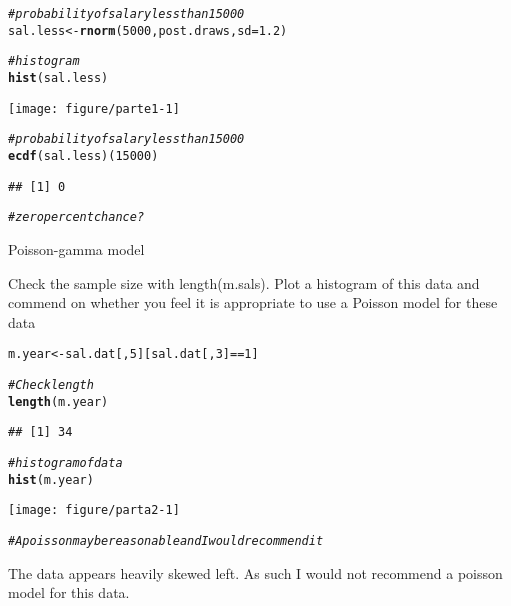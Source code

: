 \documentclass[12pt]{article}\usepackage[]{graphicx}\usepackage[]{color}
\makeatletter
\def\maxwidth{ %
  \ifdim\Gin@nat@width>\linewidth
    \linewidth
  \else
    \Gin@nat@width
  \fi
}
\newcommand{\hlnum}[1]{\textcolor[rgb]{0.686,0.059,0.569}{#1}}%
\newcommand{\hlcom}[1]{\textcolor[rgb]{0.678,0.584,0.686}{\textit{#1}}}%
\newcommand{\hlopt}[1]{\textcolor[rgb]{0,0,0}{#1}}%
\newcommand{\hlstd}[1]{\textcolor[rgb]{0.345,0.345,0.345}{#1}}%
\newcommand{\hlkwb}[1]{\textcolor[rgb]{0.69,0.353,0.396}{#1}}%
\newcommand{\hlkwc}[1]{\textcolor[rgb]{0.333,0.667,0.333}{#1}}%
\newcommand{\hlkwd}[1]{\textcolor[rgb]{0.737,0.353,0.396}{\textbf{#1}}}%
\newenvironment{kframe}{%
 \def\at@end@of@kframe{}%
 \ifinner\ifhmode%
  \def\at@end@of@kframe{\end{minipage}}%
  \begin{minipage}{\columnwidth}%
 \fi\fi%
 \def\FrameCommand##1{\hskip\@totalleftmargin \hskip-\fboxsep
 \colorbox{shadecolor}{##1}\hskip-\fboxsep
     \hskip-\linewidth \hskip-\@totalleftmargin \hskip\columnwidth}%
 \MakeFramed {\advance\hsize-\width
   \@totalleftmargin\z@ \linewidth\hsize
   \@setminipage}}%
 {\par\unskip\endMakeFramed%
 \at@end@of@kframe}
\newenvironment{knitrout}{}{} %
\newenvironment{exercise}[2][Exercise]{\begin{trivlist}
\item[\hskip \labelsep {\bfseries #1}\hskip \labelsep {\bfseries #2.}]}{\end{trivlist}}
\newenvironment{problem}[2][Problem]{\begin{trivlist}
\item[\hskip \labelsep {\bfseries #1}\hskip \labelsep {\bfseries #2.}]}{\end{trivlist}}
\makeatother
\begin{document}
\begin{knitrout}
\color{fgcolor}\begin{kframe}
\begin{alltt}
\hlcom{#probability of salary less than 15000}
\hlstd{sal.less} \hlkwb{<-} \hlkwd{rnorm}\hlstd{(}\hlnum{5000}\hlstd{,post.draws,}\hlkwc{sd}\hlstd{=}\hlnum{1.2}\hlstd{)}

\hlcom{#histogram}
\hlkwd{hist}\hlstd{(sal.less)}
\end{alltt}
\end{kframe}

{\centering \texttt{[image: figure/parte1-1]} 

}


\begin{kframe}\begin{alltt}
\hlcom{#probability of salary less than 15000}
\hlkwd{ecdf}\hlstd{(sal.less)(}\hlnum{15000}\hlstd{)}
\end{alltt}
\begin{verbatim}
## [1] 0
\end{verbatim}
\begin{alltt}
\hlcom{# zero percent chance?}
\end{alltt}
\end{kframe}
\end{knitrout}


\begin{exercise}{2}Poisson-gamma model
\end{exercise}

\begin{problem}{a}
Check the sample size with length(m.sals). Plot a histogram of this data and commend on whether you feel it is appropriate to use a Poisson model for these data
\end{problem}
\begin{knitrout}
\color{fgcolor}\begin{kframe}
\begin{alltt}
\hlstd{m.year} \hlkwb{<-} \hlstd{sal.dat[,}\hlnum{5}\hlstd{][sal.dat[,}\hlnum{3}\hlstd{]}\hlopt{==}\hlnum{1}\hlstd{]}

\hlcom{#Check length}
\hlkwd{length}\hlstd{(m.year)}
\end{alltt}
\begin{verbatim}
## [1] 34
\end{verbatim}
\begin{alltt}
\hlcom{# histogram of data}
\hlkwd{hist}\hlstd{(m.year)}
\end{alltt}
\end{kframe}

{\centering \texttt{[image: figure/parta2-1]} 

}


\begin{kframe}\begin{alltt}
\hlcom{# A poisson may be reasonable and I would recommend it}
\end{alltt}
\end{kframe}
\end{knitrout}
 The data appears heavily skewed left. As such I would not recommend a poisson model for this data.
 
\end{document}
